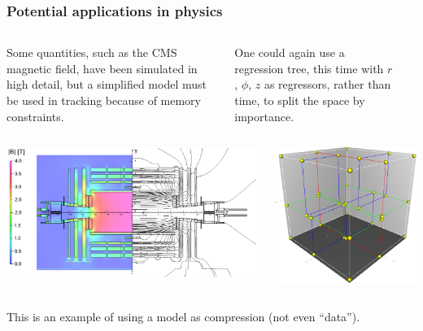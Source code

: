 \documentclass[compress]{beamer}
\begin{document}
\begin{frame}
\frametitle{Potential applications in physics}

\vspace{0.5 cm}
\begin{columns}
Some quantities, such as the CMS magnetic field, have been simulated in high detail, but a simplified model must be used in tracking because of memory constraints.

One could again use a regression tree, this time with $r$, $\phi$, $z$ as regressors, rather than time, to split the space by importance.

\mbox{ }
\end{columns}

\vspace{0.2 cm}
\begin{columns}
\includegraphics[width=\linewidth]{PLOTS/Sections_IntroductionFigs_MagField.png}

\includegraphics[width=\linewidth]{PLOTS/3dtree.png}
\end{columns}

\vspace{0.5 cm}
This is an example of using a model as compression (not even ``data'').
\end{frame}
\end{document}
